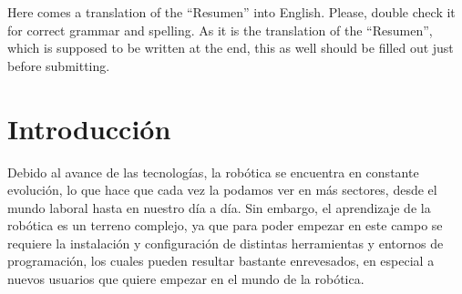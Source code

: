 \documentclass[a4paper, 12pt]{book}
\begin{document}
Here comes a translation of the ``Resumen'' into English. 
Please, double check it for correct grammar and spelling.
As it is the translation of the ``Resumen'', which is supposed to be written at the end, this as well should be filled out just before submitting.





\tableofcontents 
\cleardoublepage
\listoffigures %
\cleardoublepage
\listoflistings


\cleardoublepage
\chapter{Introducción}
\label{sec:intro}

Debido al avance de las tecnologías, la robótica se encuentra en constante evolución, lo que hace que cada vez la podamos ver en más sectores, desde el mundo laboral hasta en nuestro día a día. Sin embargo, el aprendizaje de la robótica es un terreno complejo, ya que para poder empezar en este campo se requiere la instalación y configuración de distintas herramientas y entornos de programación, los cuales pueden resultar bastante enrevesados, en especial a nuevos usuarios que quiere empezar en el mundo de la robótica.
\end{document}
